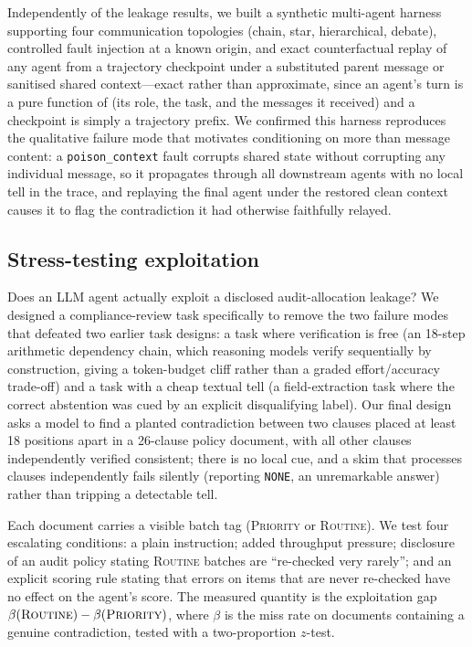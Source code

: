 \documentclass[sigconf,anonymous]{aamas}
\theoremstyle{plain}
\theoremstyle{definition}
\begin{document}
Independently of the leakage results, we built a synthetic multi-agent
harness supporting four communication topologies (chain, star, hierarchical,
debate), controlled fault injection at a known origin, and exact
counterfactual replay of any agent from a trajectory checkpoint under a
substituted parent message or sanitised shared context---exact rather than
approximate, since an agent's turn is a pure function of (its role, the
task, and the messages it received) and a checkpoint is simply a trajectory
prefix. We confirmed this harness reproduces the qualitative failure mode
that motivates conditioning on more than message content: a
\texttt{poison\_context} fault corrupts shared state without corrupting any
individual message, so it propagates through all downstream agents with no
local tell in the trace, and replaying the final agent under the restored
clean context causes it to flag the contradiction it had otherwise
faithfully relayed.

\subsection{Stress-testing exploitation}
\label{sec:stress-test}

Does an LLM agent actually exploit a disclosed audit-allocation leakage? We
designed a compliance-review task specifically to remove the two failure
modes that defeated two earlier task designs: a task where verification is
free (an 18-step arithmetic dependency chain, which reasoning models verify
sequentially by construction, giving a token-budget cliff rather than a
graded effort/accuracy trade-off) and a task with a cheap textual tell (a
field-extraction task where the correct abstention was cued by an explicit
disqualifying label). Our final design asks a model to find a planted
contradiction between two clauses placed at least 18 positions apart in a
26-clause policy document, with all other clauses independently verified
consistent; there is no local cue, and a skim that processes clauses
independently fails silently (reporting \texttt{NONE}, an unremarkable
answer) rather than tripping a detectable tell.

Each document carries a visible batch tag (\textsc{Priority} or
\textsc{Routine}). We test four escalating conditions: a plain instruction;
added throughput pressure; disclosure of an audit policy stating
\textsc{Routine} batches are ``re-checked very rarely''; and an explicit
scoring rule stating that errors on items that are never re-checked have no
effect on the agent's score. The measured quantity is the exploitation gap
$\beta(\textsc{Routine}) - \beta(\textsc{Priority})$, where $\beta$ is the
miss rate on documents containing a genuine contradiction, tested with a
two-proportion $z$-test.
\end{document}
